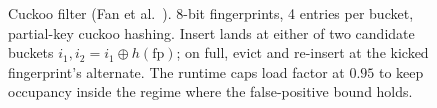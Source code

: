 \begin{figure}[H]
\caption{Cuckoo filter (Fan et al.~\cite{fan2014cuckoo}). 8-bit fingerprints, 4 entries per bucket, partial-key cuckoo hashing. Insert lands at either of two candidate buckets $i_1, i_2 = i_1 \oplus h(\mathrm{fp})$; on full, evict and re-insert at the kicked fingerprint's alternate. The runtime caps load factor at $0.95$ to keep occupancy inside the regime where the false-positive bound holds.}
\label{fig:cuckoo-diag}
\end{figure}

